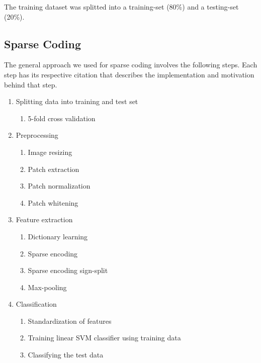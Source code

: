 \documentclass[	DIV=calc,%
				paper=a4,%
				fontsize=11pt,%
				twocolumn]{scrartcl}	 %
\begin{document}
The training dataset was splitted into a training-set (80\%) and a testing-set (20\%).

\subsection*{Sparse Coding}
The general approach we used for sparse coding involves the following steps. Each step has its respective citation that describes the implementation and motivation behind that step.
\begin{enumerate}
\item Splitting data into training and test set
	\begin{enumerate}
	\item 5-fold cross validation \cite{sklearn_cross_validation}
	\end{enumerate}
\item Preprocessing
	\begin{enumerate}
	\item Image resizing \cite{coates2011analysis}
	\item Patch extraction \cite{coates2011analysis}
	\item Patch normalization \cite{coates2011analysis}
	\item Patch whitening \cite{coates2011analysis}
	\end{enumerate}
\item Feature extraction
	\begin{enumerate}
	\item Dictionary learning \cite{mairal2009online, spams}
	\item Sparse encoding \cite{mairal2009online, spams}
	\item Sparse encoding sign-split 
	\item Max-pooling  \cite{yang2009linear, scherer2010evaluation}
	\end{enumerate}
\item Classification
	\begin{enumerate}
	\item Standardization of features \cite{wiki_feature_scaling}
	\item Training linear SVM classifier using training data \cite{svm_light}
	\item Classifying the test data \cite{svm_light}
	\end{enumerate}
\end{enumerate}
\end{document}
